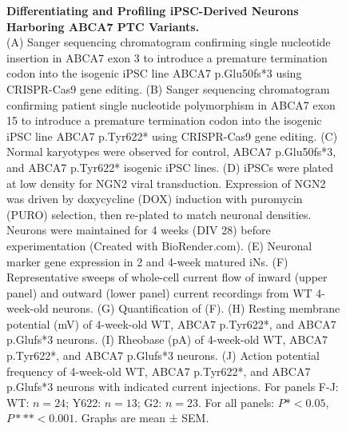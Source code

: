 \begin{figure}[ht]
    \centering
    \caption{
        \textbf{Differentiating and Profiling iPSC-Derived Neurons Harboring ABCA7 PTC Variants.}\\[1ex]
        (A) Sanger sequencing chromatogram confirming single nucleotide insertion in ABCA7 exon 3 to introduce a premature termination codon into the isogenic iPSC line ABCA7 p.Glu50fs*3 using CRISPR-Cas9 gene editing. 
        (B) Sanger sequencing chromatogram confirming patient single nucleotide polymorphism in ABCA7 exon 15 to introduce a premature termination codon into the isogenic iPSC line ABCA7 p.Tyr622* using CRISPR-Cas9 gene editing. 
        (C) Normal karyotypes were observed for control, ABCA7 p.Glu50fs*3, and ABCA7 p.Tyr622* isogenic iPSC lines. 
        (D) iPSCs were plated at low density for NGN2 viral transduction. Expression of NGN2 was driven by doxycycline (DOX) induction with puromycin (PURO) selection, then re-plated to match neuronal densities. Neurons were maintained for 4 weeks (DIV 28) before experimentation (Created with BioRender.com). 
        (E) Neuronal marker gene expression in 2 and 4-week matured iNs. 
        (F) Representative sweeps of whole-cell current flow of inward (upper panel) and outward (lower panel) current recordings from WT 4-week-old neurons. 
        (G) Quantification of (F). 
        (H) Resting membrane potential (mV) of 4-week-old WT, ABCA7 p.Tyr622*, and ABCA7 p.Glufs*3 neurons. 
        (I) Rheobase (pA) of 4-week-old WT, ABCA7 p.Tyr622*, and ABCA7 p.Glufs*3 neurons. 
        (J) Action potential frequency of 4-week-old WT, ABCA7 p.Tyr622*, and ABCA7 p.Glufs*3 neurons with indicated current injections. For panels F-J: WT: $n=24$; Y622: $n=13$; G2: $n=23$. For all panels: $P*<0.05$, $P***<0.001$. Graphs are mean ± SEM.
    }
    \label{fig:differentiating_iPSC_neurons}
\end{figure}

